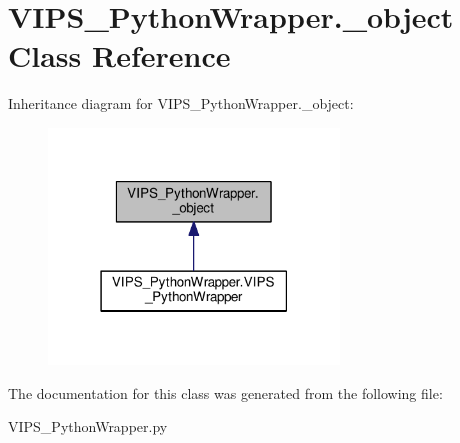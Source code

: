 \hypertarget{classVIPS__PythonWrapper_1_1__object}{}\section{V\+I\+P\+S\+\_\+\+Python\+Wrapper.\+\_\+object Class Reference}
\label{classVIPS__PythonWrapper_1_1__object}


Inheritance diagram for V\+I\+P\+S\+\_\+\+Python\+Wrapper.\+\_\+object\+:
\nopagebreak
\begin{figure}[H]
\begin{center}
\leavevmode
\includegraphics[width=219pt]{classVIPS__PythonWrapper_1_1__object__inherit__graph}
\end{center}
\end{figure}


The documentation for this class was generated from the following file\+:\begin{DoxyCompactItemize}
\item 
V\+I\+P\+S\+\_\+\+Python\+Wrapper.\+py\end{DoxyCompactItemize}
